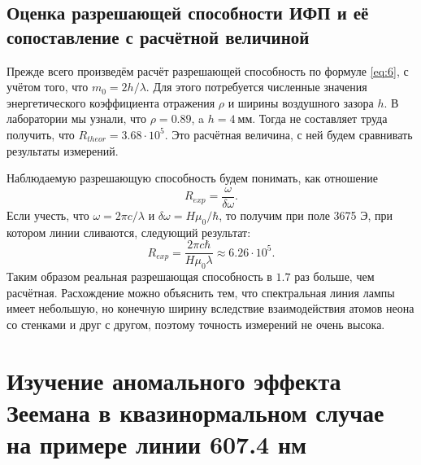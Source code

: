 \documentclass[12pt]{article}
\begin{document}
	\subsection{Оценка разрешающей способности ИФП и её сопоставление с расчётной величиной}
	Прежде всего произведём расчёт разрешающей способность по формуле \ref{eq:6}, с учётом того, что $m_0 = 2h/\lambda$. Для этого потребуется численные значения энергетического коэффициента отражения $\rho$ и ширины воздушного зазора $h$. В лаборатории мы узнали, что $\rho = 0.89$, a $h = 4\ \text{мм}$. Тогда не составляет труда получить, что $R_{theor} = 3.68 \cdot 10^5$. Это расчётная величина, с ней будем сравнивать результаты измерений.
	\par Наблюдаемую разрешающую способность будем понимать, как отношение
	\begin{equation}
		R_{exp} = \dfrac{\omega}{\delta \omega}.
	\end{equation}
	Если учесть, что $\omega = 2\pi c / \lambda$ и $\delta \omega = H\mu_0 / \hbar$, то получим при поле 3675 Э, при котором линии сливаются, следующий результат:
	\begin{equation}
		R_{exp} = \dfrac{2\pi c \hbar}{H \mu_0 \lambda} \approx 6.26 \cdot 10^5.
	\end{equation}
	Таким образом реальная разрешающая способность в $1.7$ раз больше, чем расчётная. Расхождение можно объяснить тем, что спектральная линия лампы имеет небольшую, но конечную ширину вследствие взаимодействия атомов неона со стенками и друг с другом, поэтому точность измерений не очень высока.

	\section{Изучение аномального эффекта Зеемана в квазинормальном случае на примере линии 607.4 нм}
\end{document}

